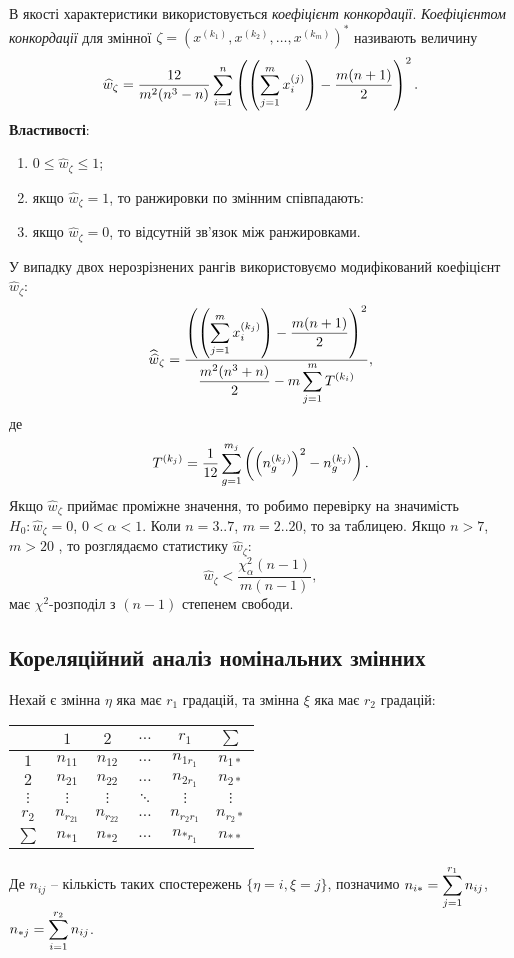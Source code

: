 В якості характеристики використовується \textit{коефіцієнт конкордації}. \textit{Коефіцієнтом конкордації} для змінної $\zeta = \left(x^{(k_1)}, x^{(k_2)}, \ldots, x^{(k_m)}\right)^*$  називають величину \[ \widehat{w}_\zeta = \dfrac{12}{m^2(n^3-n)}\displaystyle\sum\limits_{i=1}^n \left(\left(\displaystyle\sum\limits_{j=1}^m x_i^{(j)}\right)-\dfrac{m(n+1)}{2}\right)^2. \]
\textbf{Властивості}:
\begin{enumerate}
	\item $0 \le \widehat{w}_\zeta \le 1$;
	\item якщо $\widehat{w}_\zeta = 1$, то ранжировки по змінним співпадають:
	\item якщо $\widehat{w}_\zeta = 0$, то відсутній зв'язок між ранжировками.
\end{enumerate}
У випадку двох нерозрізнених рангів використовуємо модифікований коефіцієнт $\widehat{w}_\zeta$:
\[ \widehat{\widehat{w}}_\zeta = \dfrac{\left(\left(\displaystyle\sum\limits_{j=1}^m x_i^{(k_j)}\right)-\dfrac{m(n+1)}{2}\right)^2}{\dfrac{m^2(n^3+n)}{2}-m \displaystyle\sum\limits_{j=1}^m T^{(k_i)}}, \] де \[ T^{(k_j)} = \dfrac{1}{12} \displaystyle\sum\limits_{g=1}^{m_j} \left(\left(n_g^{(k_j)}\right)^2-n_g^{(k_j)}\right). \]
Якщо $\widehat{w}_\zeta$ приймає проміжне значення, то робимо перевірку на значимість $H_0: \widehat{w}_\zeta = 0$, $0 < \alpha < 1$. Коли $n = 3..7$, $m = 2..20$, то за таблицею. Якщо $n > 7$, $m > 20$ , то розглядаємо статистику $\widehat{w}_\zeta$: \[\widehat{w}_\zeta < \dfrac{\chi_\alpha^2(n-1)}{m(n-1)},\] має $\chi^2$-розподіл з $(n-1)$ степенем свободи.
\subsection{Кореляційний аналіз номінальних змінних}
Нехай є змінна $\eta$ яка має $r_1$ градацій, та змінна $\xi$ яка має $r_2$ градацій:
\begin{table}[H]
	\centering
	\begin{tabular}{|c|c|c|c|c|c|}
	\hline
	& $1$ & $2$ & $\ldots$ & $r_1$ & $\sum$ \\
 \hline
	$1$ & $n_{11}$ & $n_{12}$ & $\ldots$ & $n_{1r_1}$ & $n_{1*}$ \\
 \hline
	$2$ & $n_{21}$ & $n_{22}$ & $\ldots$ & $n_{2r_1}$ & $n_{2*}$ \\
 \hline
	$\vdots$ & $\vdots$ & $\vdots$ & $\ddots$ & $\vdots$ & $\vdots$ \\
 \hline
	$r_2$ & $n_{r_21}$ & $n_{r_22}$ & $\ldots$ & $n_{r_2r_1}$ & $n_{r_2*}$ \\
 \hline
	$\sum$ & $n_{*1}$ & $n_{*2}$ & $\ldots$ & $n_{*r_1}$ & $n_{**}$ \\
 \hline
	\end{tabular}
\end{table}
Де $n_{ij}$ -- кількість таких спостережень $\{\eta=i,\xi=j\}$, позначимо $n_{i*} = \displaystyle\sum\limits_{j=1}^{r_1} n_{ij}$, $n_{*j} = \displaystyle\sum\limits_{i=1}^{r_2} n_{ij}$. \\

